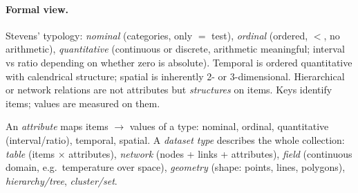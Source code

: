 \paragraph{Formal view.} Stevens' typology: \emph{nominal} (categories, only $=$ test), \emph{ordinal} (ordered, $<$, no arithmetic), \emph{quantitative} (continuous or discrete, arithmetic meaningful; interval vs ratio depending on whether zero is absolute). Temporal is ordered quantitative with calendrical structure; spatial is inherently 2- or 3-dimensional. Hierarchical or network relations are not attributes but \emph{structures} on items. Keys identify items; values are measured on them.

\begin{definition}\label{def:types}
An \emph{attribute} maps items $\to$ values of a type: nominal, ordinal, quantitative (interval/ratio), temporal, spatial. A \emph{dataset type} describes the whole collection: \emph{table} (items $\times$ attributes), \emph{network} (nodes + links + attributes), \emph{field} (continuous domain, e.g.\ temperature over space), \emph{geometry} (shape: points, lines, polygons), \emph{hierarchy/tree}, \emph{cluster/set}.
\end{definition}

